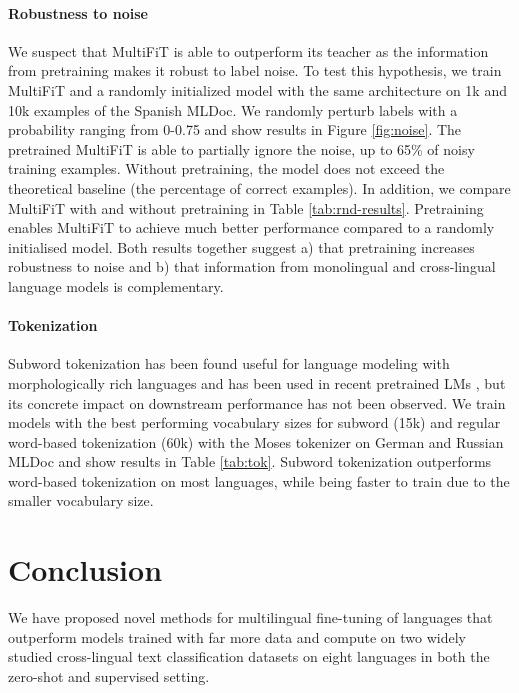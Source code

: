 \documentclass[11pt,a4paper]{article}
\begin{document}
\paragraph{Robustness to noise} We suspect that MultiFiT is able to outperform its teacher as the information from pretraining makes it robust to label noise. To test this hypothesis, we train MultiFiT and a randomly initialized model with the same architecture on 1k and 10k examples of the Spanish MLDoc. We randomly perturb labels with a probability ranging from 0-0.75 and show results in Figure \ref{fig:noise}. The pretrained MultiFiT is able to partially ignore the noise, up to 65\% of noisy training examples. Without pretraining, the model does not exceed the theoretical baseline (the percentage of correct examples). In addition, we compare MultiFiT with and without pretraining in Table \ref{tab:rnd-results}. Pretraining enables MultiFiT to achieve much better performance compared to a randomly initialised model. Both results together suggest a) that pretraining increases robustness to noise and b) that information from monolingual and cross-lingual language models is complementary.



\paragraph{Tokenization} Subword tokenization has been found useful for language modeling with morphologically rich languages \cite{Czapla2018,Mielke2019} and has been used in recent pretrained LMs \cite{Devlin2018}, but its concrete impact on downstream performance has not been observed. We train models with the best performing vocabulary sizes for subword (15k) and regular word-based tokenization (60k) with the Moses tokenizer \cite{koehn2007moses} on German and Russian MLDoc and show results in Table \ref{tab:tok}. Subword tokenization outperforms word-based tokenization on most languages, while being faster to train due to the smaller vocabulary size.

\section{Conclusion}

We have proposed novel methods for multilingual fine-tuning of languages that outperform models trained with far more data and compute on two widely studied cross-lingual text classification datasets on eight languages in both the zero-shot and supervised setting.
\end{document}
